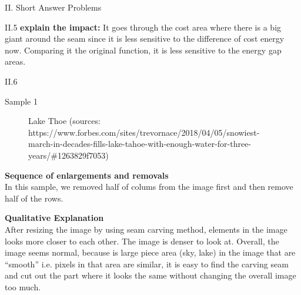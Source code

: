\documentclass[a4paper,12pt]{article}
\begin{document}
\begin{section}{II. Short Answer Problems}
\begin{subsection}{II.5}
\textbf{explain the impact:}
It goes through the cost area where there is a big giant around the seam since it is less sensitive to the difference of cost energy now. Comparing it the original function, it is less sensitive to the energy gap areas.



\clearpage
\begin{subsection}{II.6}

\begin{subsubsection}{Sample 1}
\begin{figure}[!htb]
        \caption{Lake Thoe (sources:  https://www.forbes.com/sites/trevornace/2018/04/05/snowiest-march-in-decades-fills-lake-tahoe-with-enough-water-for-three-years/\#1263829f7053)
}
\end{figure}

\textbf{Sequence of enlargements and removals}\\
In this sample, we removed half of colums from the image first and then remove half of the rows.

\textbf{Qualitative Explanation}\\
After resizing the image by using seam carving method, elements in the image looks more closer to each other. The image is denser to look at. Overall, the image seems normal, because is large piece area (sky, lake) in the image that are ``smooth'' i.e. pixels in that area are similar, it is easy to find the carving seam and cut out the part where it looks the same without changing the overall image too much. 
\end{subsubsection}


\end{subsection}
\end{subsection}
\end{section}
\end{document}
